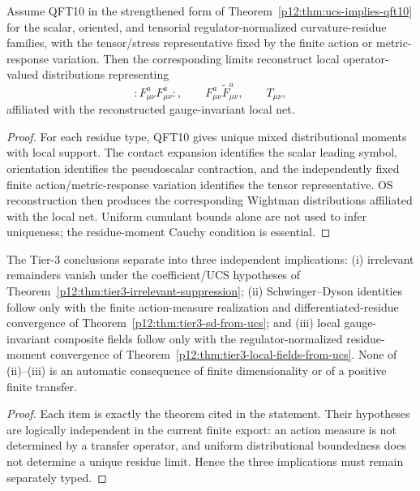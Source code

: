 \documentclass[12pt,a4paper]{article}
\begin{document}
\begin{theorem}
\label{p12:thm:tier3-local-fields-from-ucs}
Assume QFT10 in the strengthened form of Theorem~\ref{p12:thm:ucs-implies-qft10} for the scalar, oriented, and tensorial regulator-normalized curvature-residue families, with the tensor/stress representative fixed by the finite action or metric-response variation.  Then the corresponding limits reconstruct local operator-valued distributions representing
\[
:F_{\mu\nu}^aF_{\mu\nu}^a:,
\qquad
F_{\mu\nu}^a\widetilde F_{\mu\nu}^a,
\qquad
T_{\mu\nu},
\]
affiliated with the reconstructed gauge-invariant local net.
\end{theorem}
\begin{proof}
For each residue type, QFT10 gives unique mixed distributional moments with local support.  The contact expansion identifies the scalar leading symbol, orientation identifies the pseudoscalar contraction, and the independently fixed finite action/metric-response variation identifies the tensor representative.  OS reconstruction then produces the corresponding Wightman distributions affiliated with the local net.  Uniform cumulant bounds alone are not used to infer uniqueness; the residue-moment Cauchy condition is essential.
\end{proof}

\begin{corollary}
\label{p12:cor:tier3-closure}
The Tier-3 conclusions separate into three independent implications: (i) irrelevant remainders vanish under the coefficient/UCS hypotheses of Theorem~\ref{p12:thm:tier3-irrelevant-suppression}; (ii) Schwinger--Dyson identities follow only with the finite action-measure realization and differentiated-residue convergence of Theorem~\ref{p12:thm:tier3-sd-from-ucs}; and (iii) local gauge-invariant composite fields follow only with the regulator-normalized residue-moment convergence of Theorem~\ref{p12:thm:tier3-local-fields-from-ucs}.  None of (ii)--(iii) is an automatic consequence of finite dimensionality or of a positive finite transfer.
\end{corollary}
\begin{proof}
Each item is exactly the theorem cited in the statement.  Their hypotheses are logically independent in the current finite export: an action measure is not determined by a transfer operator, and uniform distributional boundedness does not determine a unique residue limit.  Hence the three implications must remain separately typed.
\end{proof}
\end{document}
